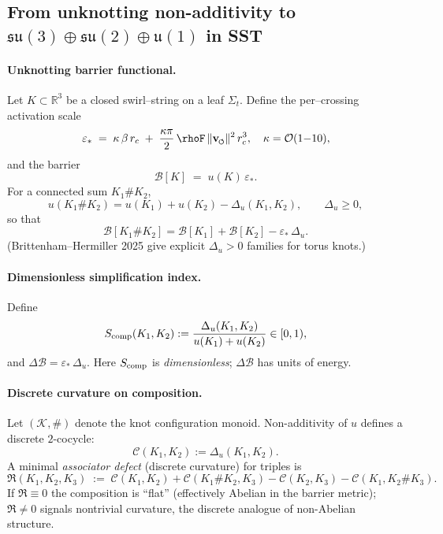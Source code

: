 \documentclass[11pt]{article}
\begin{document}

        \subsection*{From unknotting non-additivity to \(\mathfrak{su}(3)\oplus\mathfrak{su}(2)\oplus\mathfrak u(1)\) in SST}

        \paragraph{Unknotting barrier functional.}
            Let \(K\subset\mathbb R^3\) be a closed swirl–string on a leaf \(\Sigma_t\).
            Define the per–crossing activation scale
            \[
                \varepsilon_*\;=\;\kappa\,\beta\,\rc\;+\;\frac{\kappa\pi}{2}\,\rhoF\,\vnorm^2\,\rc^3,
                \quad \kappa=\mathcal O(1{-}10),
            \]
            and the barrier
            \[
                \mathcal B[K]\;=\;u(K)\,\varepsilon_*.
            \]
            For a connected sum \(K_1\#K_2\),
            \[
                u(K_1\#K_2)=u(K_1)+u(K_2)-\Delta_u(K_1,K_2),\qquad \Delta_u\ge 0,
            \]
            so that
            \[
                \mathcal B[K_1\#K_2]=\mathcal B[K_1]+\mathcal B[K_2]-\varepsilon_*\,\Delta_u.
            \]
            (Brittenham–Hermiller 2025 give explicit \(\Delta_u>0\) families for torus knots.)

        \paragraph{Dimensionless simplification index.}
            Define
            \[
                S_{\rm comp}(K_1,K_2):=\frac{\Delta_u(K_1,K_2)}{u(K_1)+u(K_2)}\in[0,1),
            \]
            and \(\Delta\mathcal B=\varepsilon_*\,\Delta_u\). Here \(S_{\rm comp}\) is \emph{dimensionless}; \(\Delta\mathcal B\) has units of energy.

        \paragraph{Discrete curvature on composition.}
            Let \((\mathcal K,\#)\) denote the knot configuration monoid. Non-additivity of \(u\) defines a discrete \(2\)-cocycle:
            \[
                \mathcal C(K_1,K_2):=\Delta_u(K_1,K_2).
            \]
            A minimal \emph{associator defect} (discrete curvature) for triples is
            \[
                \mathfrak{R}(K_1,K_2,K_3)\;:=\;
                \mathcal C(K_1,K_2)+\mathcal C(K_1\#K_2,K_3)
                -\mathcal C(K_2,K_3)-\mathcal C(K_1,K_2\#K_3).
            \]
            If \(\mathfrak{R}\equiv 0\) the composition is “flat” (effectively Abelian in the barrier metric); \(\mathfrak{R}\neq 0\) signals nontrivial curvature, the discrete analogue of non-Abelian structure.
\end{document}

